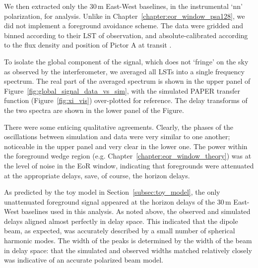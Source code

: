 We then extracted only the 30\,m East-West baselines, in the instrumental `nn' polarization, for analysis. Unlike in Chapter~\ref{chapter:eor_window_psa128}, we did not implement a foreground avoidance scheme. The data were gridded and binned according to their LST of observation, and absolute-calibrated according to the flux density and position of Pictor A at transit \citep[][the same calibration shown in Chapter~\ref{chapter:eor_window_psa128}]{Jacobs.13}.

To isolate the global component of the signal, which does not `fringe' on the sky as observed by the interferometer, we averaged all LSTs into a single frequency spectrum. The real part of the averaged spectrum is shown in the upper panel of Figure~\ref{fig:global_signal_data_vs_sim}, with the simulated PAPER transfer function (Figure~\ref{fig:xi_vis}) over-plotted for reference. The delay transforms of the two spectra are shown in the lower panel of the Figure.

There were some enticing qualitative agreements. Clearly, the phases of the oscillations between simulation and data were very similar to one another; noticeable in the upper panel and very clear in the lower one. 
The power within the foreground wedge region (e.g. Chapter~\ref{chapter:eor_window_theory}) was at the level of noise in the EoR window, indicating that foregrounds were attenuated at the appropriate delays, save, of course, the horizon delays.

As predicted by the toy model in Section~\ref{subsec:toy_model}, the only unattenuated foreground signal appeared at the horizon delays of the 30\,m East-West baselines used in this analysis. As noted above, the observed and simulated delays aligned almost perfectly in delay space. This indicated that the dipole beam, as expected, was accurately described by a small number of spherical harmonic modes. The width of the peaks is determined by the width of the beam in delay space: that the simulated and observed widths matched relatively closely was indicative of an accurate polarized beam model. 

